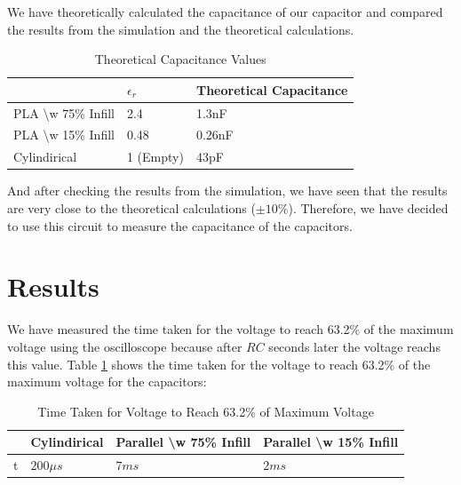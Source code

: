 We have theoretically calculated the capacitance of our capacitor and compared the results from the simulation and the theoretical calculations.


\begin{table}[h]
    \centering
    \begin{tabular}{l|l|l|}
    \cline{2-3}
                                                            & $\epsilon_r$ & Theoretical Capacitance \\ \hline
    \multicolumn{1}{|l|}{PLA \textbackslash{}w 75\% Infill} & 2.4     & 1.3nF                       \\ \hline
    \multicolumn{1}{|l|}{PLA \textbackslash{}w 15\% Infill} & 0.48    & 0.26nF                \\ \hline
    \multicolumn{1}{|l|}{Cylindirical} & 1 (Empty)    & 43pF                  \\ \hline
    \end{tabular}
    \caption{Theoretical Capacitance Values}
\end{table}

And after checking the results from the simulation, we have seen that the results are very close to the theoretical calculations ($\pm10\%$). Therefore, we have decided to use this circuit to measure the capacitance of the capacitors.


\newpage{}
\thispagestyle{plain}

\section{Results}

We have measured the time taken for the voltage to reach 63.2\% of the maximum voltage using the oscilloscope because after $RC$ seconds later the voltage reachs this value. Table \ref{fig:time-taken} shows the time taken for the voltage to reach 63.2\% of the maximum voltage for the capacitors:

\begin{center}
    \begin{table}[h]
        \centering
            \begin{tabular}{l|l|l|l|}
            \cline{2-4}
                                    & Cylindirical & Parallel \textbackslash{}w 75\% Infill & Parallel \textbackslash{}w 15\% Infill \\ \hline
            \multicolumn{1}{|l|}{t} & $200\mu s$          & $7ms$                                   & $2ms$                                     \\ \hline
            \end{tabular}
        \caption{Time Taken for Voltage to Reach 63.2\% of Maximum Voltage}
        \label{fig:time-taken}
        \end{table}
\end{center}

